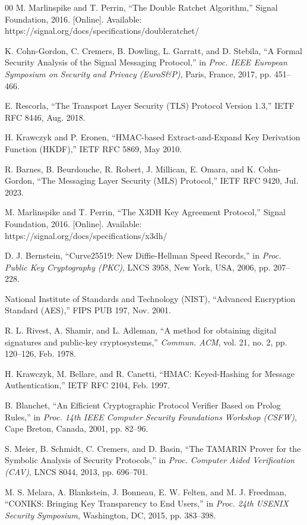 \documentclass[conference]{IEEEtran}
\begin{document}
\begin{thebibliography}{00}
 M. Marlinspike and T. Perrin, ``The Double Ratchet Algorithm,'' Signal Foundation, 2016. [Online]. Available: https://signal.org/docs/specifications/doubleratchet/

 K. Cohn-Gordon, C. Cremers, B. Dowling, L. Garratt, and D. Stebila, ``A Formal Security Analysis of the Signal Messaging Protocol,'' in \textit{Proc. IEEE European Symposium on Security and Privacy (EuroS\&P)}, Paris, France, 2017, pp. 451--466.

 E. Rescorla, ``The Transport Layer Security (TLS) Protocol Version 1.3,'' IETF RFC 8446, Aug. 2018.

 H. Krawczyk and P. Eronen, ``HMAC-based Extract-and-Expand Key Derivation Function (HKDF),'' IETF RFC 5869, May 2010.

 R. Barnes, B. Beurdouche, R. Robert, J. Millican, E. Omara, and K. Cohn-Gordon, ``The Messaging Layer Security (MLS) Protocol,'' IETF RFC 9420, Jul. 2023.

 M. Marlinspike and T. Perrin, ``The X3DH Key Agreement Protocol,'' Signal Foundation, 2016. [Online]. Available: https://signal.org/docs/specifications/x3dh/

 D. J. Bernstein, ``Curve25519: New Diffie-Hellman Speed Records,'' in \textit{Proc. Public Key Cryptography (PKC)}, LNCS 3958, New York, USA, 2006, pp. 207--228.

 National Institute of Standards and Technology (NIST), ``Advanced Encryption Standard (AES),'' FIPS PUB 197, Nov. 2001.

 R. L. Rivest, A. Shamir, and L. Adleman, ``A method for obtaining digital signatures and public-key cryptosystems,'' \textit{Commun. ACM}, vol. 21, no. 2, pp. 120--126, Feb. 1978.

 H. Krawczyk, M. Bellare, and R. Canetti, ``HMAC: Keyed-Hashing for Message Authentication,'' IETF RFC 2104, Feb. 1997.

 B. Blanchet, ``An Efficient Cryptographic Protocol Verifier Based on Prolog Rules,'' in \textit{Proc. 14th IEEE Computer Security Foundations Workshop (CSFW)}, Cape Breton, Canada, 2001, pp. 82--96.

 S. Meier, B. Schmidt, C. Cremers, and D. Basin, ``The TAMARIN Prover for the Symbolic Analysis of Security Protocols,'' in \textit{Proc. Computer Aided Verification (CAV)}, LNCS 8044, 2013, pp. 696--701.

 M. S. Melara, A. Blankstein, J. Bonneau, E. W. Felten, and M. J. Freedman, ``CONIKS: Bringing Key Transparency to End Users,'' in \textit{Proc. 24th USENIX Security Symposium}, Washington, DC, 2015, pp. 383--398.
\end{thebibliography}
\end{document}
